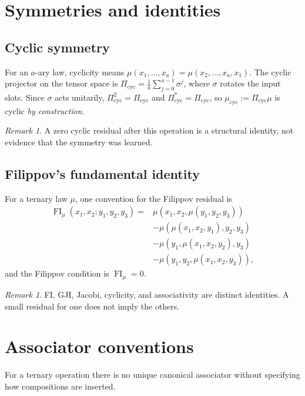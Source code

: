 \documentclass[11pt]{amsart}
\theoremstyle{definition}
\theoremstyle{remark}
\newtheorem{remark}[theorem]{Remark}
\begin{document}
\section{Symmetries and identities}

\subsection{Cyclic symmetry}

For an $a$-ary law, cyclicity means
$\mu(x_1,\ldots,x_a) = \mu(x_2,\ldots,x_a,x_1)$.
The cyclic projector on the tensor space is
$\Pi_{\mathrm{cyc}} = \tfrac1a\sum_{j=0}^{a-1}\sigma^j$,
where $\sigma$ rotates the input slots. Since $\sigma$ acts unitarily,
$\Pi_{\mathrm{cyc}}^2=\Pi_{\mathrm{cyc}}$ and
$\Pi_{\mathrm{cyc}}^*=\Pi_{\mathrm{cyc}}$, so
$\mu_{\mathrm{cyc}} := \Pi_{\mathrm{cyc}}\mu$ is cyclic \emph{by
construction}.

\begin{remark}
A zero cyclic residual after this operation is a structural identity,
not evidence that the symmetry was learned.
\end{remark}

\subsection{Filippov's fundamental identity}

For a ternary law $\mu$, one convention for the Filippov residual is
\begin{align*}
\operatorname{FI}_\mu(x_1,x_2;y_1,y_2,y_3)
={}&\mu(x_1,x_2,\mu(y_1,y_2,y_3))\\
&-\mu(\mu(x_1,x_2,y_1),y_2,y_3)\\
&-\mu(y_1,\mu(x_1,x_2,y_2),y_3)\\
&-\mu(y_1,y_2,\mu(x_1,x_2,y_3)),
\end{align*}
and the Filippov condition is $\operatorname{FI}_\mu = 0$.

\begin{remark}
FI, GJI, Jacobi, cyclicity, and associativity are distinct identities.
A small residual for one does not imply the others.
\end{remark}

\section{Associator conventions}

For a ternary operation there is no unique canonical associator
without specifying how compositions are inserted.
\end{document}
